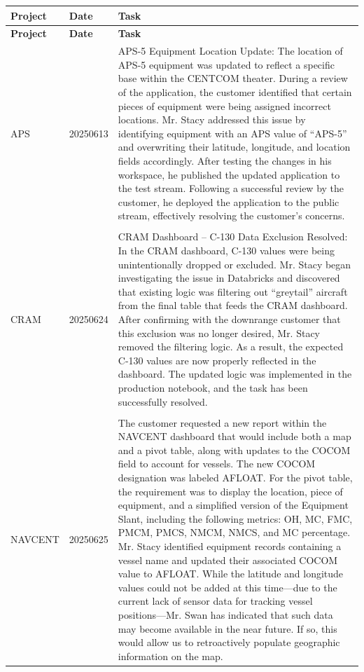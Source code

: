 \documentclass{article}
\begin{document}
\begin{longtable}{@{}p{2.5cm} p{2.5cm} p{9cm}@{}}
\toprule
\textbf{ Project } & \textbf{ Date } & \textbf{ Task } \\
\midrule
\endfirsthead

\toprule
\textbf{ Project } & \textbf{ Date } & \textbf{ Task } \\
\midrule
\endhead

\bottomrule
\endfoot


APS & 20250613 & APS-5 Equipment Location Update: The location of APS-5 equipment was updated to reflect a specific base within the CENTCOM theater. During a review of the application, the customer identified that certain pieces of equipment were being assigned incorrect locations. Mr. Stacy addressed this issue by identifying equipment with an APS value of “APS-5” and overwriting their latitude, longitude, and location fields accordingly. After testing the changes in his workspace, he published the updated application to the test stream. Following a successful review by the customer, he deployed the application to the public stream, effectively resolving the customer’s concerns. \\

\\[-0.5ex]  %


CRAM & 20250624 & CRAM Dashboard – C-130 Data Exclusion Resolved: In the CRAM dashboard, C-130 values were being unintentionally dropped or excluded. Mr. Stacy began investigating the issue in Databricks and discovered that existing logic was filtering out “greytail” aircraft from the final table that feeds the CRAM dashboard. After confirming with the downrange customer that this exclusion was no longer desired, Mr. Stacy removed the filtering logic. As a result, the expected C-130 values are now properly reflected in the dashboard. The updated logic was implemented in the production notebook, and the task has been successfully resolved. \\

\\[-0.5ex]  %


NAVCENT & 20250625 & The customer requested a new report within the NAVCENT dashboard that would include both a map and a pivot table, along with updates to the COCOM field to account for vessels. The new COCOM designation was labeled AFLOAT.  For the pivot table, the requirement was to display the location, piece of equipment, and a simplified version of the Equipment Slant, including the following metrics: OH, MC, FMC, PMCM, PMCS, NMCM, NMCS, and MC percentage.  Mr. Stacy identified equipment records containing a vessel name and updated their associated COCOM value to AFLOAT. While the latitude and longitude values could not be added at this time—due to the current lack of sensor data for tracking vessel positions—Mr. Swan has indicated that such data may become available in the near future. If so, this would allow us to retroactively populate geographic information on the map. \\


\end{longtable}
\end{document}
